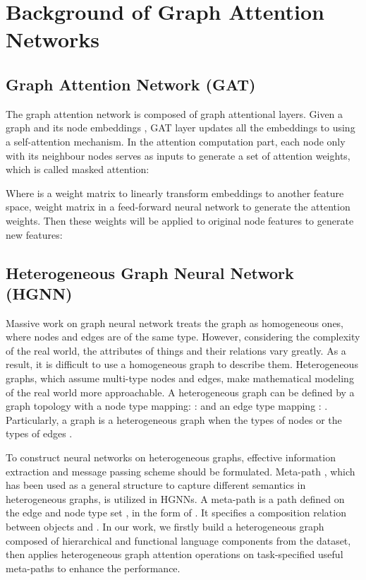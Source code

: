 \documentclass[letterpaper]{article} \usepackage{aaai21}  \usepackage{times}  \usepackage{helvet} \usepackage{courier}  \usepackage[hyphens]{url}  \usepackage{graphicx} \urlstyle{rm} \def\UrlFont{\rm}  \usepackage{natbib}  \usepackage{caption} \frenchspacing  \setlength{\pdfpagewidth}{8.5in}  \setlength{\pdfpageheight}{11in}
\begin{document}
\section{Background of Graph Attention Networks}






\subsection{Graph Attention Network (GAT)}
The graph attention network is composed of graph attentional layers.
Given a graph  and its node embeddings , GAT layer updates all the embeddings to  using a self-attention mechanism.
In the attention computation part, each node only with its neighbour nodes serves as inputs to generate a set of attention weights, which is called masked attention:

Where  is a weight matrix to linearly transform embeddings to another feature space,  weight matrix in a feed-forward neural network to generate the attention weights. Then these weights will be applied to original node features to generate new features:


\subsection{Heterogeneous Graph Neural Network (HGNN)}
Massive work on graph neural network treats the graph as homogeneous ones, where nodes and edges are of the same type.
However, considering the complexity of the real world, the attributes of things and their relations vary greatly.
As a result, it is difficult to use a homogeneous graph to describe them.
Heterogeneous graphs, which assume multi-type nodes and edges, make mathematical modeling of the real world more approachable.
A heterogeneous graph can be defined by a graph topology  with a node type mapping: :  and an edge type mapping : . Particularly, a graph is a heterogeneous graph when the types of nodes  or the types of edges .
\par
To construct neural networks on heterogeneous graphs, effective information extraction and message passing scheme should be formulated.
Meta-path \cite{sun2011pathsim}, which has been used as a general structure to capture different semantics in heterogeneous graphs, is utilized in HGNNs.
A meta-path is a path defined on the edge and node type set , in the form of . It specifies a composition relation  between objects  and . In our work, we firstly build a heterogeneous graph composed of hierarchical and functional language components from the dataset, then applies heterogeneous graph attention operations on task-specified useful meta-paths to enhance the performance.
\end{document}
